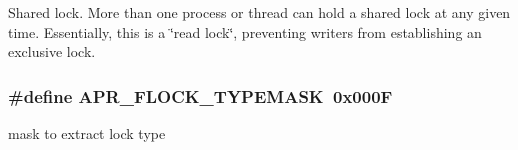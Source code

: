 Shared lock. More than one process or thread can hold a shared lock at any given time. Essentially, this is a \char`\"{}read lock\char`\"{}, preventing writers from establishing an exclusive lock. \hypertarget{group__apr__file__lock__types_ga40777e364fb20bb9a9ee57e74b19c13d}{
\subsubsection[{A\-P\-R\-\_\-\-F\-L\-O\-C\-K\-\_\-\-T\-Y\-P\-E\-M\-A\-S\-K}]{\setlength{\rightskip}{0pt plus 5cm}\#define A\-P\-R\-\_\-\-F\-L\-O\-C\-K\-\_\-\-T\-Y\-P\-E\-M\-A\-S\-K~0x000\-F}}\label{group__apr__file__lock__types_ga40777e364fb20bb9a9ee57e74b19c13d}
mask to extract lock type 